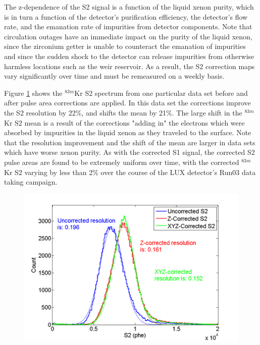 \documentclass[a4paper,12pt]{article}
\begin{document}
{The z-dependence of the S2 signal is a function of the liquid xenon purity, which is in turn a function of the detector's purification efficiency, the detector's flow rate, and the emanation rate of impurities from detector components.  Note that circulation outages have an immediate impact on the purity of the liquid xenon, since the zirconium getter is unable to counteract the emanation of impurities and since the sudden shock to the detector can release impurities from otherwise harmless locations such as the weir reservoir.  As a result, the S2 correction maps vary significantly over time and must be remeasured on a weekly basis.



\newpage

Figure \ref{KrS2Improvement} shows the $^{83m}$Kr S2 spectrum from one particular data set before and after pulse area corrections are applied. In this data set the corrections improve the S2 resolution by 22\%, and shifts the mean by 21\%.  The large shift in the $^{83m}$Kr S2 mean is a result of the corrections "adding in" the electrons which were absorbed by impurities in the liquid xenon as they traveled to the surface.  Note that the resolution improvement and the shift of the mean are larger in data sets which have worse xenon purity.  As with the corrected S1 signal, the corrected S2 pulse areas are found to be extremely uniform over time, with the corrected $^{83m}$Kr S2 varying by less than 2\% over the course of the LUX detector's Run03 data taking campaign.

\begin{figure} [!h]
\includegraphics[scale=.7]{KRS2_ResolutionImprovement.png} 
\label{KrS2Improvement}
\end{figure}

}
\end{document}
